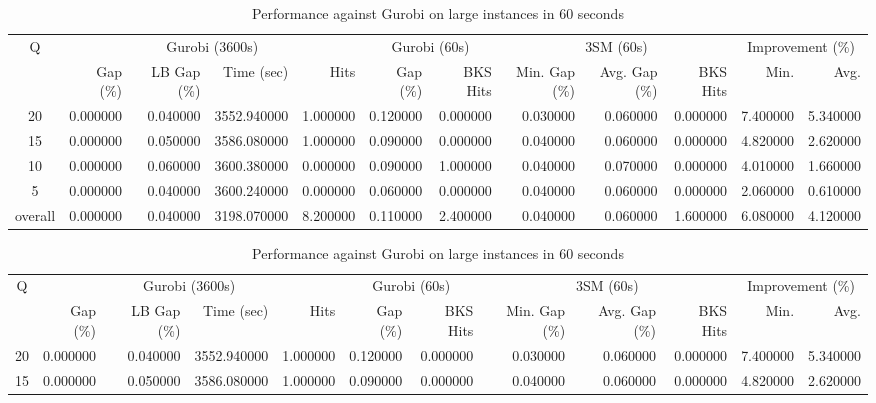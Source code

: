 \begin{table}[H]
\caption{Performance against Gurobi on large instances in 60 seconds}
\label{tab:3lm_resuts200T60}
\begin{tabular}{c rrrr rr rrr rr}
\toprule
Q & \multicolumn{4}{c}{Gurobi (3600s)} & \multicolumn{2}{c}{Gurobi (60s)} & \multicolumn{3}{c}{3SM (60s)} & \multicolumn{2}{c}{Improvement (\%)} \\
 & Gap (\%) & LB Gap (\%) & Time (sec) & Hits & Gap (\%) & BKS Hits & Min. Gap (\%) & Avg. Gap (\%) & BKS Hits & Min. & Avg. \\
\midrule
\cmidrule(lr){1-1} \cmidrule(lr){2-5} \cmidrule(lr){2-5} \cmidrule(lr){6-7} \cmidrule(lr){8-10} \cmidrule(lr){11-12}
20 & 0.000000 & 0.040000 & 3552.940000 & 1.000000 & 0.120000 & 0.000000 & 0.030000 & 0.060000 & 0.000000 & 7.400000 & 5.340000 \\
15 & 0.000000 & 0.050000 & 3586.080000 & 1.000000 & 0.090000 & 0.000000 & 0.040000 & 0.060000 & 0.000000 & 4.820000 & 2.620000 \\
10 & 0.000000 & 0.060000 & 3600.380000 & 0.000000 & 0.090000 & 1.000000 & 0.040000 & 0.070000 & 0.000000 & 4.010000 & 1.660000 \\
5 & 0.000000 & 0.040000 & 3600.240000 & 0.000000 & 0.060000 & 0.000000 & 0.040000 & 0.060000 & 0.000000 & 2.060000 & 0.610000 \\
\midrule
overall & 0.000000 & 0.040000 & 3198.070000 & 8.200000 & 0.110000 & 2.400000 & 0.040000 & 0.060000 & 1.600000 & 6.080000 & 4.120000 \\
\bottomrule
\end{tabular}
\end{table}\begin{table}[H]
\caption{Performance against Gurobi on large instances in 60 seconds}
\label{tab:3lm_resuts200T60}
\begin{tabular}{c rrrr rr rrr rr}
\toprule
Q & \multicolumn{4}{c}{Gurobi (3600s)} & \multicolumn{2}{c}{Gurobi (60s)} & \multicolumn{3}{c}{3SM (60s)} & \multicolumn{2}{c}{Improvement (\%)} \\
 & Gap (\%) & LB Gap (\%) & Time (sec) & Hits & Gap (\%) & BKS Hits & Min. Gap (\%) & Avg. Gap (\%) & BKS Hits & Min. & Avg. \\
\midrule
\cmidrule(lr){1-1} \cmidrule(lr){2-5} \cmidrule(lr){2-5} \cmidrule(lr){6-7} \cmidrule(lr){8-10} \cmidrule(lr){11-12}
20 & 0.000000 & 0.040000 & 3552.940000 & 1.000000 & 0.120000 & 0.000000 & 0.030000 & 0.060000 & 0.000000 & 7.400000 & 5.340000 \\
15 & 0.000000 & 0.050000 & 3586.080000 & 1.000000 & 0.090000 & 0.000000 & 0.040000 & 0.060000 & 0.000000 & 4.820000 & 2.620000 \\

\end{tabular}
\end{table}
